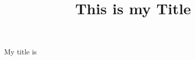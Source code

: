 \documentclass{article}
\title{This is my Title}
\makeatletter
\renewcommand{\maketitle}
{\begin{center}
\bfseries\Large \@title
\makeatother

\end{center}}
\newcommand{\makemytitle}
{\begin{center}
\itshape\Large \mytitlename
\end{center}}
\makeatother
\begin{document}
\makemytitle
My title is \mytitlename

\lipsum[1-2]
\end{document}
